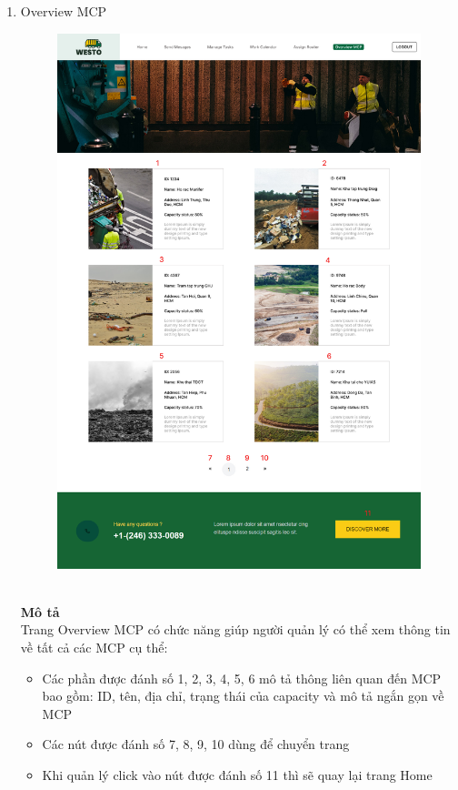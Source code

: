 \documentclass[a4paper]{article}
\begin{document}
\begin{enumerate}
    \item Overview MCP
        \begin{figure}[!h]
    \begin{center}
      \includegraphics[width=5in]{Image/Overview_MCP.png}
    \end{center}
\end{figure} 
\\
    \textbf{Mô tả}\\
    Trang Overview MCP có chức năng giúp người quản lý có thể xem thông tin về tất cả các MCP cụ thể:
    \begin{itemize}
    \item Các phần được đánh số 1, 2, 3, 4, 5, 6 mô tả thông liên quan đến MCP bao gồm: ID, tên, địa chỉ, trạng thái của capacity và mô tả ngắn gọn về MCP 
    \item Các nút được đánh số 7, 8, 9, 10 dùng để chuyển trang
    \item Khi quản lý click vào nút được đánh số 11 thì sẽ quay lại trang Home
    \end{itemize}
\end{enumerate}
\end{document}
